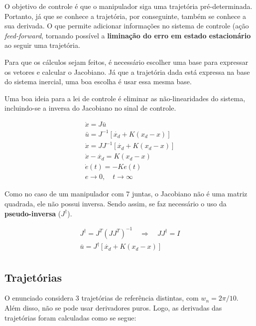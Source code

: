 \documentclass[a4paper,11pt]{article}
\theoremstyle{mytheor}
\begin{document}
O objetivo de controle é que o manipulador siga uma trajetória pré-determinada. Portanto, já que se conhece a trajetória, por conseguinte, também se conhece a sua derivada. O que permite adicionar informações no sistema de controle (ação \textit{feed-forward}, tornando possível a \textbf{liminação do erro em estado estacionário} ao seguir uma trajetória.

Para que os cálculos sejam feitos, é necessário escolher uma base para expressar os vetores e calcular o Jacobiano. Já que a trajetória dada está expressa na base do sistema inercial, uma boa escolha é usar essa mesma base.

Uma boa ideia para a lei de controle é eliminar as não-linearidades do sistema, incluindo-se a inversa do Jacobiano no sinal de controle.

\begin{gather*}
\dot{x} = J\bar{u} \\
\bar{u} = J^{-1} [ \dot{x_d} + K (x_d - x) ] \\
\dot{x} = JJ^{-1} [ \dot{x_d} + K (x_d - x) ] \\
\dot{x} - \dot{x_d} = K (x_d - x) \\
\dot{e}(t)= -Ke(t)  \\
e \longrightarrow 0, \quad t \longrightarrow \infty
\end{gather*}

Como no caso de um manipulador com 7 juntas, o Jacobiano não é uma matriz quadrada, ele não possui inversa. Sendo assim, se faz necessário o uso da \textbf{pseudo-inversa} ($ J^\dagger $).


\begin{gather*}
J^\dagger = J^T(JJ^T)^{-1} \quad \Rightarrow \quad JJ^\dagger = I \\
\bar{u} = J^{\dagger} [ \dot{x_d} + K (x_d - x) ] \\
\end{gather*}


\subsection{Trajetórias}

O enunciado considera 3 trajetórias de referência distintas, com $w_n = 2\pi/10 $. Além disso, não se pode usar derivadores puros. Logo, as derivadas das trajetórias foram calculadas como se segue:
\end{document}
